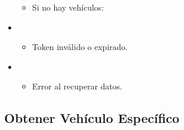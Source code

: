 \documentclass[letterpaper,10pt,spanish]{sphinxmanual}
\begin{document}
\begin{fulllineitems}
\begin{itemize}
\begin{itemize}
\item {} 
\sphinxAtStartPar
Si no hay vehículos:

\begin{sphinxVerbatim}[commandchars=\\\{\}]
\end{sphinxVerbatim}

\end{itemize}

\item {} 
\sphinxAtStartPar
{}
\begin{itemize}
\item {} 
\sphinxAtStartPar
Token inválido o expirado.

\end{itemize}

\item {} 
\sphinxAtStartPar
{}
\begin{itemize}
\item {} 
\sphinxAtStartPar
Error al recuperar datos.

\end{itemize}

\end{itemize}

\end{fulllineitems}



\subsection{Obtener Vehículo Específico}
\label{\detokenize{endpoints:obtener-vehiculo-especifico}}
\end{document}
